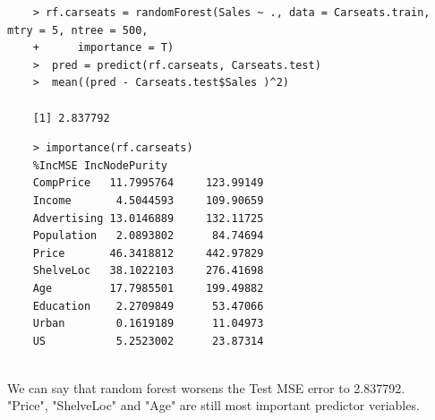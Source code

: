 \documentclass{article}
\begin{document}
\begin{program}
	\begin{verbatim}
	> rf.carseats = randomForest(Sales ~ ., data = Carseats.train, mtry = 5, ntree = 500,
	+      importance = T)
	>  pred = predict(rf.carseats, Carseats.test)
	>  mean((pred - Carseats.test$Sales )^2)
	
	[1] 2.837792
	\end{verbatim}
\end{program}

\begin{program}
	\begin{verbatim}
	> importance(rf.carseats)
	%IncMSE IncNodePurity
	CompPrice   11.7995764     123.99149
	Income       4.5044593     109.90659
	Advertising 13.0146889     132.11725
	Population   2.0893802      84.74694
	Price       46.3418812     442.97829
	ShelveLoc   38.1022103     276.41698
	Age         17.7985501     199.49882
	Education    2.2709849      53.47066
	Urban        0.1619189      11.04973
	US           5.2523002      23.87314
	
	\end{verbatim}
\end{program}

We can say that random forest worsens the Test MSE error to 2.837792.\\

"Price", "ShelveLoc" and "Age" are still most important predictor veriables.

\newpage
\end{document}
